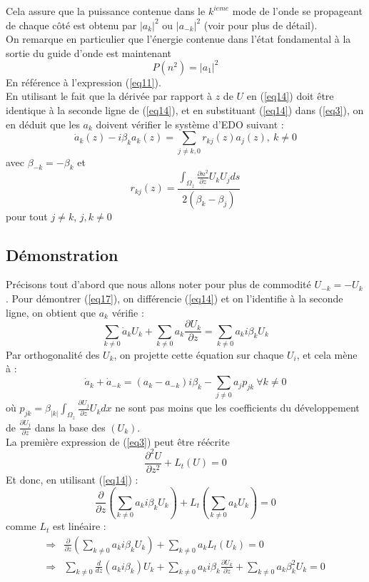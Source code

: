 \documentclass{article}
\begin{document}
Cela assure que la puissance contenue dans le $k^{ieme}$ mode de l'onde se propageant de chaque côté est obtenu par $|a_k|^2$ ou $|a_{-k}|^2$ (voir \cite{Snyd} pour plus de détail).\\
On remarque en particulier que l'énergie contenue dans l'état fondamental à la sortie du guide d'onde est maintenant 
\begin{equation}\label{eq16} P(n^2)=|a_1|^2\end{equation}
En référence à l'expression (\ref{eq11}).\\
En utilisant le fait que la dérivée par rapport à $z$ de $U$ en (\ref{eq14}) doit être identique à la seconde ligne de (\ref{eq14}), et en substituant (\ref{eq14}) dans (\ref{eq3}), on en déduit que les $a_k$ doivent vérifier le système d'EDO suivant :
\begin{equation} \label{eq17}
\dot{a}_k(z)-i\beta_ka_k(z)=\sum_{j\neq k,0} r_{kj}(z)a_j(z),\ k\neq 0
\end{equation}
avec $\beta_{-k}=-\beta_k$ et \[r_{kj}(z)=\frac{\int_{\Omega_z} \frac{\partial n^2}{\partial z} U_kU_j ds}{2(\beta_k-\beta_j)}\]
pour tout $j\neq k$, $j,k\neq 0$\\
\subsection{Démonstration}
Précisons tout d'abord que nous allons noter pour plus de commodité $U_{-k}=-U_k$. Pour démontrer (\ref{eq17}), on différencie (\ref{eq14}) et on l'identifie à la seconde ligne, on obtient que $a_k$ vérifie :
	\[\sum_{k\neq 0} \dot{a}_kU_k + \sum_{k\neq 0} a_k\frac{\partial U_k}{\partial z} = \sum_{k\neq 0} a_ki\beta_k U_k\]
Par orthogonalité des $U_k$, on projette cette équation sur chaque $U_i$, et cela mène à :
\begin{equation}\label{eq29}
	\dot{a}_k+\dot{a}_{-k}=(a_k-a_{-k})i\beta_k-\sum_{j\neq 0} a_j p_{jk}\ \forall k\neq 0
\end{equation}
où $p_{jk}=\beta_{|k|}\int_{\Omega_z} \frac{\partial U_j}{\partial z}U_k dx$ ne sont pas moins que les coefficients du développement de $\frac{\partial U_j}{\partial z}$ dans la base des $(U_k)$.\\
La première expression de (\ref{eq3}) peut être réécrite \[\frac{\partial^2 U}{\partial z^2}+L_t(U)=0\]
Et donc, en utilisant (\ref{eq14}) :
\[\frac{\partial}{\partial z} \left( \sum_{k\neq 0} a_ki\beta_kU_k\right)+L_t\left(\sum_{k\neq 0} a_kU_k\right) = 0\]
comme $L_t$ est linéaire :
\begin{eqnarray*}
\Rightarrow& \frac{\partial}{\partial z} \left( \sum_{k\neq 0} a_ki\beta_kU_k\right)+\sum_{k\neq 0} a_kL_t\left(U_k\right) = 0\\
\Rightarrow& \sum_{k\neq 0} \frac{d}{dz}(a_ki\beta_k)U_k+\sum_{k\neq 0} a_ki\beta_k\frac{\partial U_k}{\partial z} + \sum_{k\neq 0} a_k\beta_k^2U_k=0
\end{eqnarray*}
\end{document}
